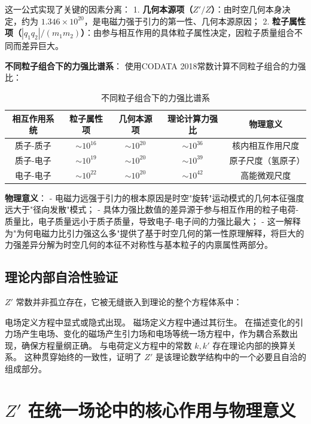 \documentclass[a4paper,12pt]{article}
\theoremstyle{plain}
\begin{document}
这一公式实现了关键的因素分离：
1. \textbf{几何本源项（$Z'/Z$）}：由时空几何本身决定，约为 $1.346\times10^{20}$，是电磁力强于引力的第一性、几何本源原因；
2. \textbf{粒子属性项（$|q_1 q_2|/(m_1 m_2)$）}：由参与相互作用的具体粒子属性决定，因粒子质量组合不同而差异巨大。

\textbf{不同粒子组合下的力强比谱系}：
使用CODATA 2018常数计算不同粒子组合的力强比：

\begin{table}[H]
\centering
\begin{tabular}{|c|c|c|c|c|}
\hline
相互作用系统 & 粒子属性项 & 几何本源项 & 理论计算力强比 & 物理意义 \\ 
\hline
质子-质子 & $\sim10^{16}$ & $\sim10^{20}$ & $\sim10^{36}$ & 核内相互作用尺度 \\ 
\hline
质子-电子 & $\sim10^{19}$ & $\sim10^{20}$ & $\sim10^{39}$ & 原子尺度（氢原子） \\ 
\hline
电子-电子 & $\sim10^{22}$ & $\sim10^{20}$ & $\sim10^{42}$ & 高能微观尺度 \\ 
\hline
\end{tabular}
\caption{不同粒子组合下的力强比谱系}
\label{tab:force_ratios}
\end{table}

\textbf{物理意义}：
- 电磁力远强于引力的根本原因是时空"旋转"运动模式的几何本征强度远大于"径向发散"模式；
- 具体力强比数值的差异源于参与相互作用的粒子电荷-质量比，电子质量远小于质子质量，导致电子-电子间的力强比最大；
- 这一解释为"为何电磁力比引力强这么多"提供了基于时空几何的第一性原理解释，将巨大的力强差异分解为时空几何的本征不对称性与基本粒子的内禀属性两部分。

\subsection{理论内部自洽性验证}
$Z'$ 常数并非孤立存在，它被无缝嵌入到理论的整个方程体系中：

电场定义方程中显式或隐式出现。
磁场定义方程中通过其衍生。
在描述变化的引力场产生电场、变化的磁场产生引力场和电场等统一场方程中，作为耦合系数出现，确保方程量纲正确。
与电荷定义方程中的常数 $k, k'$ 存在理论内部的换算关系。
这种贯穿始终的一致性，证明了 $Z'$ 是该理论数学结构中的一个必要且自洽的组成部分。

\section{$Z'$ 在统一场论中的核心作用与物理意义}
\end{document}
